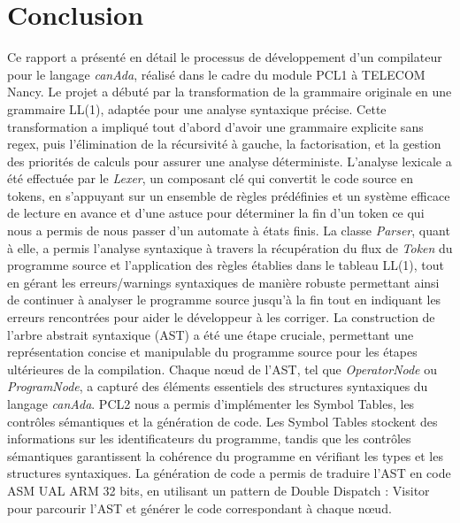 \documentclass[french,a4paper]{article}
\begin{document}
    \section{Conclusion}\label{sec:conclusion}
    Ce rapport a présenté en détail le processus de développement d'un compilateur pour le langage \textit{canAda}, réalisé dans le cadre du module PCL1 à TELECOM Nancy.
    Le projet a débuté par la transformation de la grammaire originale en une grammaire LL(1), adaptée pour une analyse syntaxique précise.
    Cette transformation a impliqué tout d'abord d'avoir une grammaire explicite sans regex, puis l'élimination de la récursivité à gauche, la factorisation, et la gestion des priorités de calculs pour assurer une analyse déterministe.
    \newline
    L'analyse lexicale a été effectuée par le \textit{Lexer}, un composant clé qui convertit le code source en tokens, en s'appuyant sur un ensemble de règles prédéfinies et un système efficace de lecture en avance et d'une astuce pour déterminer la fin d'un token ce qui nous a permis de nous passer d'un automate à états finis.
    La classe \textit{Parser}, quant à elle, a permis l'analyse syntaxique à travers la récupération du flux de \textit{Token} du programme source et l'application des règles établies dans le tableau LL(1), tout en gérant les erreurs/warnings syntaxiques de manière robuste permettant ainsi de continuer à analyser le programme source jusqu'à la fin tout en indiquant les erreurs rencontrées pour aider le développeur à les corriger.
    \newline
    La construction de l'arbre abstrait syntaxique (AST) a été une étape cruciale, permettant une représentation concise et manipulable du programme source pour les étapes ultérieures de la compilation.
    Chaque nœud de l'AST, tel que \textit{OperatorNode} ou \textit{ProgramNode}, a capturé des éléments essentiels des structures syntaxiques du langage \textit{canAda}.
    \newline
    PCL2 nous a permis d'implémenter les Symbol Tables, les contrôles sémantiques et la génération de code. Les Symbol Tables stockent des informations sur les identificateurs du programme, tandis que les contrôles sémantiques garantissent la cohérence du programme en vérifiant les types et les structures syntaxiques. La génération de code a permis de traduire l'AST en code ASM UAL ARM 32 bits, en utilisant un pattern de Double Dispatch : Visitor pour parcourir l'AST et générer le code correspondant à chaque nœud.
\end{document}
